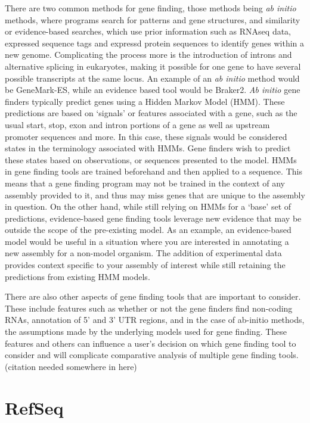 There are two common methods for gene finding, those methods being
\textit{ab initio} methods, where programs search for patterns and
gene structures, and similarity or evidence-based searches, which use
prior information such as RNAseq data, expressed sequence tags and
expressd protein sequences to identify genes within a new
genome\cite{Ejigu2020}. Complicating the process more is the
introduction of introns and alternative splicing in eukaryotes, making
it possible for one gene to have several possible transcripts at the
same locus. An example of an \textit{ab initio} method would be
GeneMark-ES\cite{10.1093/nar/gki937}, while an evidence based tool
would be Braker2\cite{Bruna2021}.
\textit{Ab initio} gene finders typically predict genes using a Hidden
Markov Model (HMM)\cite{Ejigu2020}. These predictions are based on
`signals' or features associated with a gene, such as the usual start,
stop, exon and intron portions of a gene as well as upstream promoter
sequences and more. In this case, these signals would be considered
states in the terminology associated with HMMs. Gene finders wish to
predict these states based on observations, or sequences presented to
the model. HMMs in gene finding tools are trained beforehand and then
applied to a sequence. This means that a gene finding program may not
be trained in the context of any assembly provided to it, and thus may
miss genes that are unique to the assembly in question.
On the other hand, while still relying on HMMs for a `base' set of
predictions, evidence-based gene finding tools leverage new evidence
that may be outside the scope of the pre-existing
model\cite{Keller2011}.  As an example, an evidence-based model would
be useful in a situation where you are interested in annotating a new
assembly for a non-model organism. The addition of experimental data
provides context specific to your assembly of interest while still
retaining the predictions from existing HMM models.

There are also other aspects of gene finding tools that are important
to consider. These include features such as whether or not the gene
finders find non-coding RNAs, annotation of 5' and 3' UTR regions, and
in the case of ab-initio methods, the assumptions made by the
underlying models used for gene finding. These features and others can
influence a user's decision on which gene finding tool to consider and
will complicate comparative analysis of multiple gene finding
tools. (citation needed somewhere in here)

\section{RefSeq}

